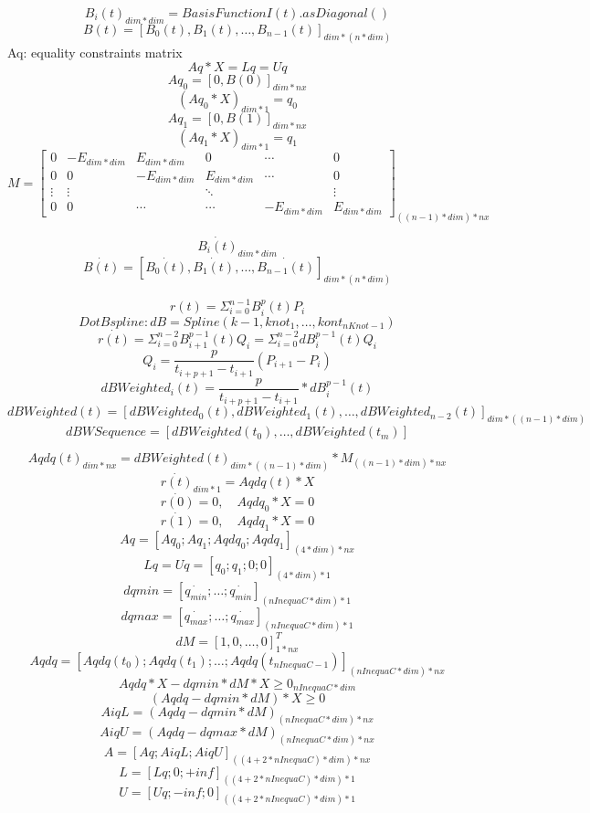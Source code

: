 \documentclass[]{article}
\begin{document}
    \[B_{i}(t)_{dim * dim} =  BasisFunctionI(t).asDiagonal()\]
    \[B(t) = [B_{0}(t), B_{1}(t), \ldots, B_{n - 1}(t)]_{dim * (n * dim)} \]
    Aq: equality constraints matrix \\
    \[Aq * X = Lq = Uq \]
    \[ Aq_{0} = [0, B(0)]_{dim * nx} \]
    \[ (Aq_{0} * X)_{dim * 1} = q_{0} \]
    \[ Aq_{1} = [0, B(1)]_{dim * nx} \]
    \[ (Aq_{1} * X)_{dim * 1} = q_{1} \]
    \[ M = \begin{bmatrix}
        0 & -E_{dim * dim} & E_{dim * dim} & 0 & \cdots & 0 \\
        0 & 0 & -E_{dim * dim} & E_{dim * dim} & \cdots & 0 \\
        \vdots &  \vdots & & \ddots & & \vdots \\
        0 & 0 & \cdots &\cdots &-E_{dim * dim} & E_{dim * dim}
    \end{bmatrix}_{((n - 1) * dim) * nx} \]

    \[ \dot{B_i(t)}_{dim * dim}\]
    \[ \dot{B(t)} =  [\dot{B_{0}(t)}, \dot{B_{1}(t)}, \ldots, \dot{B_{n - 1}(t)}]_{dim * (n * dim)} \]
    
    
    \[ r(t) = \Sigma_{i = 0}^{n - 1}B_{i}^{p}(t)P_{i} \]
    \[ DotBspline: dB = Spline(k - 1, {knot_1,\dots, kont_{nKnot - 1}}) \]
    \[ \dot{r(t)} = \Sigma_{i = 0}^{n - 2}B_{i + 1}^{p - 1}(t)Q_{i} = \Sigma_{i = 0}^{n - 2}dB_{i}^{p - 1}(t)Q_{i} \]
    \[ Q_{i} = \frac{p}{t_{i + p + 1} - t_{i + 1}}(P_{i + 1} - P_{i}) \]
    \[ dBWeighted_{i}(t) = \frac{p}{t_{i + p + 1} - t_{i + 1}} * dB_{i}^{p - 1}(t) \]
    \[ dBWeighted(t) =  [dBWeighted_{0}(t), dBWeighted_{1}(t), \ldots, dBWeighted_{n - 2}(t)]_{dim * ((n - 1) * dim)} \]
    \[ dBWSequence = [dBWeighted(t_0), \dots, dBWeighted(t_m)] \]

    \[ Aqdq(t)_{dim * nx} = dBWeighted(t)_{dim * ((n - 1) * dim)} * M_{((n - 1) * dim) * nx} \]
    \[ \dot{r(t)}_{dim * 1} = Aqdq(t) * X \]
    \[ \dot{r(0)} = 0,\quad Aqdq_{0} * X = 0 \]
    \[ \dot{r(1)} = 0,\quad Aqdq_{1} * X = 0 \]
    \[ Aq = [Aq_{0}; Aq_{1}; Aqdq_{0}; Aqdq_{1}]_{(4 * dim) * nx} \]
    \[ Lq = Uq = [q_{0}; q_{1}; 0; 0]_{(4 * dim) * 1} \]
    \[ dqmin = [\dot{q_{min}}; \ldots; \dot{q_{min}}]_{(nInequaC * dim) * 1} \]
    \[ dqmax = [\dot{q_{max}}; \ldots; \dot{q_{max}}]_{(nInequaC * dim) * 1} \]
    \[ dM = [1, 0, \ldots, 0]^T_{1 * nx} \]
    \[ Aqdq = [Aqdq(t_{0}); Aqdq(t_{1}); \ldots; Aqdq(t_{nInequaC - 1})]_{(nInequaC * dim) * nx} \]
    \[ Aqdq * X - dqmin * dM * X \geq 0_{nInequaC * dim} \]
    \[ (Aqdq - dqmin * dM) * X \geq 0 \]
    \[ AiqL = (Aqdq - dqmin * dM)_{(nInequaC * dim) * nx} \]
    \[ AiqU = (Aqdq - dqmax * dM)_{(nInequaC * dim) * nx} \]
    \[ A = [Aq; AiqL; AiqU]_{((4 + 2 * nInequaC) * dim) * nx}\]
    \[ L = [Lq; 0; +inf]_{((4 + 2 * nInequaC) * dim) * 1}\]
    \[ U = [Uq; -inf; 0]_{((4 + 2 * nInequaC) * dim) * 1}\]
\end{document}
